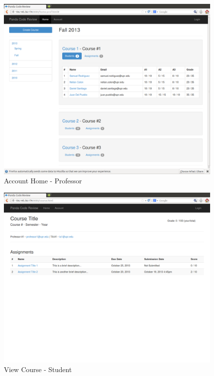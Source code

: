 \begin{figure}[H]
	\centering
	\includegraphics[width=\textwidth]{img/courses-prof}
	\caption{Account Home - Professor}
\end{figure}

\begin{figure}[H]
	\centering
	\includegraphics[width=\textwidth]{img/course}
	\caption{View Course - Student}
\end{figure}

